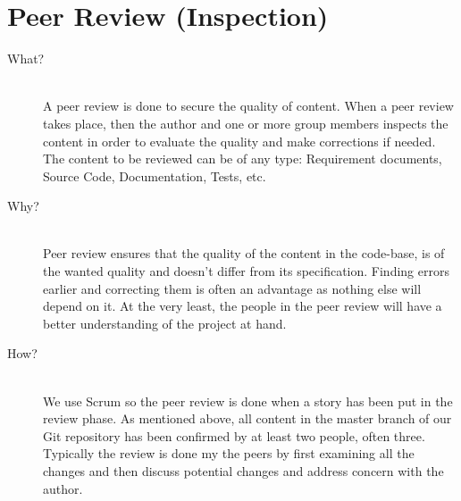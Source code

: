 \section{Peer Review (Inspection)}
\label{sec:peerreview}
\begin{description}
    \item[What?]\hfill\\
    A peer review is done to secure the quality of content. 
    When a peer review takes place, then the author and one or more group members inspects the content in order to evaluate the quality and make corrections if needed. 
    The content to be reviewed can be of any type: Requirement documents, Source Code, Documentation, Tests, etc.

    \item[Why?]\hfill\\ 
    Peer review ensures that the quality of the content in the code-base, is of the wanted quality and doesn't differ from its specification. 
    Finding errors earlier and correcting them is often an advantage as nothing else will depend on it. 
    At the very least, the people in the peer review will have a better understanding of the project at hand.

    \item[How?]\hfill\\
    We use Scrum so the peer review is done when a story has been put in the review phase. 
    As mentioned above, all content in the master branch of our Git repository has been confirmed by at least two people, often three. 
    Typically the review is done my the peers by first examining all the changes and then discuss potential changes and address concern with the author. 
\end{description}

